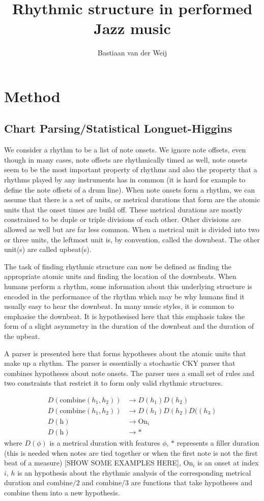 \documentclass[a4paper,10pt]{article}
\title{Rhythmic structure in performed Jazz music}
\author{Bastiaan van der Weij}
\begin{document}
\section{Method}
\label{sec:method}

\subsection{Chart Parsing/Statistical Longuet-Higgins}

\label{sec:chart}

We consider a rhythm to be a list of note onsets. We ignore note offsets, even though in many cases, note offsets are rhythmically timed as well, note onsets seem to be the most important property of rhythms and also the property that a rhythms played by any instruments has in common (it is hard for example to define the note offsets of a drum line). When note onsets form a rhythm, we can assume that there is a set of units, or metrical durations that form are the atomic units that the onset times are build off. These metrical durations are mostly constrained to be duple or triple divisions of each other. Other divisions are allowed as well but are far less common. When a metrical unit is divided into two or three units, the leftmost unit is, by convention, called the downbeat. The other unit(s) are called upbeat(s).

The task of finding rhythmic structure can now be defined as finding the appropriate atomic units and finding the location of the downbeats. When humans perform a rhythm, some information about this underlying structure is encoded in the performance of the rhythm which may be why humans find it usually easy to hear the downbeat. In many music styles, it is common to emphasise the downbeat. It is hypothesised here that this emphasis takes the form of a slight asymmetry in the duration of the downbeat and the duration of the upbeat.

A parser is presented here that forms hypotheses about the atomic units that make up a rhythm. The parser is essentially a stochastic CKY parser that combines hypotheses about note onsets. The parser uses a small set of rules and two constraints that restrict it to form only valid rhythmic structures. 

\begin{align*}
\label{eq:rules}
D(\textrm{combine}(h_1, h_2)) &\rightarrow D(h_1) D(h_2)\\
D(\textrm{combine}(h_1, h_2)) &\rightarrow D(h_1) D(h_2) D((h_3)\\
D(\textrm{h}) &\rightarrow \textrm{On}_i\\
D(\textrm{h}) &\rightarrow *
\end{align*}
where $D(\phi)$ is a metrical duration with features $\phi$, $*$ represents a filler duration (this is needed when notes are tied together or when the first note is not the first beat of a measure) [SHOW SOME EXAMPLES HERE], $\textrm{On}_i$ is an onset at index $i$, $h$ is an hypothesis about the rhythmic analysis of the corresponding metrical duration and $\textrm{combine}/2$ and $\textrm{combine}/3$ are functions that take hypotheses and combine them into a new hypothesis.
\end{document}
